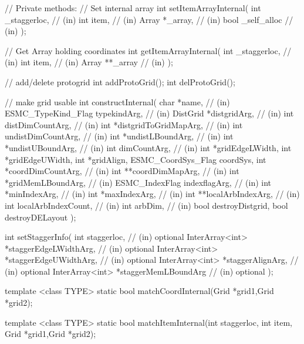 {{ 
   // Private methods:
   // Set internal array
   int setItemArrayInternal(
             int _staggerloc, // (in)
             int item,       // (in)
             Array *_array,   // (in)
             bool _self_alloc // (in)
             );
 
   // Get Array holding coordinates
  int getItemArrayInternal(
             int _staggerloc, // (in)
             int item,       // (in)
             Array **_array   // (in)
             );
 
 
   // add/delete protogrid  
   int addProtoGrid();
   int delProtoGrid();
 
   // make grid usable
   int constructInternal(
        char *name,                            // (in)
        ESMC_TypeKind_Flag typekindArg,              // (in)
        DistGrid *distgridArg,                  // (in)
        int distDimCountArg,                        // (in)
        int *distgridToGridMapArg,                         // (in)
        int undistDimCountArg,                      // (in)
        int *undistLBoundArg,                        // (in)
        int *undistUBoundArg,                        // (in)
        int dimCountArg,                            // (in)
        int *gridEdgeLWidth,
        int *gridEdgeUWidth,
        int *gridAlign,
        ESMC_CoordSys_Flag coordSys, 
        int *coordDimCountArg,                     // (in)
        int **coordDimMapArg,                   // (in)
        int *gridMemLBoundArg,                      // (in)
        ESMC_IndexFlag indexflagArg,             // (in)
        int *minIndexArg,                       // (in)
        int *maxIndexArg,                       // (in)
        int **localArbIndexArg,                       // (in)
        int localArbIndexCount,                       // (in)
        int arbDim,                           // (in)
        bool destroyDistgrid,
        bool destroyDELayout
        );
 
 
   int setStaggerInfo(
              int staggerloc,             // (in) optional
              InterArray<int> *staggerEdgeLWidthArg, // (in) optional
              InterArray<int> *staggerEdgeUWidthArg, // (in) optional
              InterArray<int> *staggerAlignArg,   // (in) optional 
              InterArray<int> *staggerMemLBoundArg   // (in) optional 
              );
 
 template <class TYPE>
   static bool matchCoordInternal(Grid *grid1,Grid *grid2);
 
 template <class TYPE>
   static bool matchItemInternal(int staggerloc, int item, Grid *grid1,Grid *grid2);
 
}}

